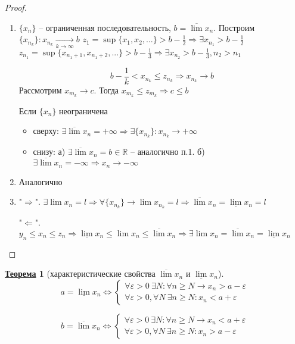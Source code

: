 \documentclass[12pt]{article}
\newenvironment{MyList}[1][4pt]{
  \begin{enumerate}[1.]
  \setlength{\parskip}{0pt}
  \setlength{\itemsep}{#1}
}{       
  \end{enumerate}
}
\newenvironment{MyItemize}[1][4pt]{
  \begin{itemize}
  \setlength{\parskip}{0pt}
  \setlength{\itemsep}{#1}
}{       
  \end{itemize}
}
\def\R{\mathbb{R}}       %
\def\SO{\Rightarrow}     %
\def\EQ{\Leftrightarrow} %
\theoremstyle{definition} %
\newtheorem{Thm}{\underline{Теорема}}[subsection] %
\theoremstyle{plain} %
\theoremstyle{remark} %
\begin{document}
\begin{proof}
    \begin{MyList}
        \item $\{x_n\}$ -- ограниченная последовательность, $b = \overline{\lim} x_n$. Построим $\{x_{n_k}\} : x_{n_k} \xrightarrow[k \to \infty]{} b$
        $z_1 = \sup \{x_1, x_2, ...\} > b - \frac{1}{2} \SO \exists x_{n_1} > b - \frac{1}{2}$ \\
        $z_{n_1} = \sup \{x_{n_1 + 1}, x_{n_1 + 2}, ...\} > b - \frac{1}{3} \SO \exists x_{n_2} > b - \frac{1}{3}, n_2 > n_1$  
        
        \[b - \frac{1}{k} < x_{n_k} \leqslant z_{n_k} \SO x_{n_k} \to b\]
        Рассмотрим $x_{m_k} \to c$. Тогда $x_{m_k} \leqslant z_{m_k} \SO c \leqslant b$
        
        Если $\{x_n\}$ неограничена 
        \begin{MyItemize}
            \item сверху: $\exists \overline{\lim}x_n = +\infty \SO \exists \{x_{n_k}\} : x_{n_k} \to +\infty$
            \item снизу: а) $\exists \overline{\lim} x_n = b \in \R$ -- аналогично п.1. б) $\exists \overline{\lim}x_n = -\infty \SO x_n \to -\infty$   
        \end{MyItemize} 

        \item Аналогично
        \item "$\SO$". $\exists \lim x_n = l \SO \forall \{x_{n_k}\} \to \lim x_{n_k} = l \SO \overline{\lim} x_n = \underline{\lim} x_n = l$
        
        "$\Leftarrow$". $y_n \leqslant x_n \leqslant z_n \SO \underline{\lim}x_n \leqslant \lim x_n \leqslant \overline{\lim} x_n \SO \exists \lim x_n = \overline{\lim} x_n = \underline{\lim} x_n$ 
    \end{MyList}
\end{proof}

\begin{Thm}[характеристические свойства $\overline{\lim}x_n$ и $\underline{\lim} x_n$]
  \[a = \underline{\lim} x_n \EQ \begin{cases}
    \forall \varepsilon > 0 \ \exists N : \forall n \geqslant N \to x_n > a - \varepsilon \\
    \forall \varepsilon > 0, \forall N \ \exists n \geqslant N : x_n < a + \varepsilon
  \end{cases}\] 

  \[b = \overline{\lim} x_n \EQ \begin{cases}
    \forall \varepsilon > 0 \ \exists N : \forall n \geqslant N \to x_n < a + \varepsilon \\
    \forall \varepsilon > 0, \forall N \ \exists n \geqslant N : x_n > a - \varepsilon
  \end{cases}\]
\end{Thm}
\end{document}
